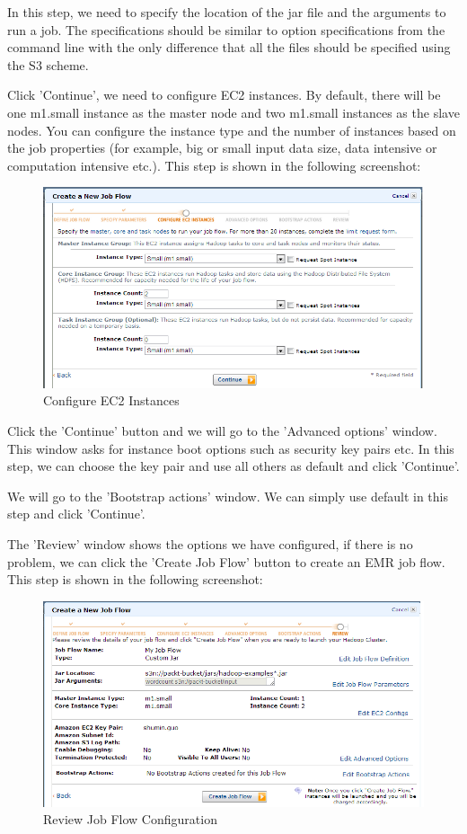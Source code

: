In this step, we need to specify the location of the jar file and the arguments to run a job. The specifications should be similar to option specifications from the command line with the only difference that all the files should be specified using the S3 scheme.

Click 'Continue', we need to configure EC2 instances. By default, there will be one m1.small instance as the master node and two m1.small instances as the slave nodes. You can configure the instance type and the number of instances based on the job properties (for example, big or small input data size, data intensive or computation intensive etc.). This step is shown in the following screenshot:

\begin{figure}[h]
  \centering
  \includegraphics[width=.8\textwidth]{figs/5163os_08_26.png}
  \caption{Configure EC2 Instances}\label{fig:aws.elasticmapred.config.instance}
\end{figure} 

Click the 'Continue' button and we will go to the 'Advanced options' window. This window asks for instance boot options such as security key pairs etc. In this step, we can choose the key pair and use all others as default and click 'Continue'.

We will go to the 'Bootstrap actions' window. We can simply use default in this step and click 'Continue'.

The 'Review' window shows the options we have configured, if there is no problem, we can click the 'Create Job Flow' button to create an EMR job flow. This step is shown in the following screenshot:

\begin{figure}[h]
  \centering
  \includegraphics[width=\textwidth]{figs/5163os_08_27.png}
  \caption{Review Job Flow Configuration}\label{fig:aws.elasticmapred.flow.review}
\end{figure} 


